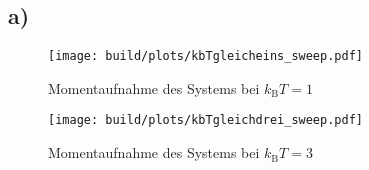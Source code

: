 \subsection*{a)}
\begin{figure*}
        \centering
        \begin{subfigure}[b]{0.475\textwidth}
            \centering
            \texttt{[image: build/plots/kbTgleicheins\_sweep.pdf]}
            \caption[Network2]%
            {{\small Momentaufnahme des Systems bei $k_\text{B}T=1$}}
            \label{fig:lcghist1}
        \end{subfigure}
        \hfill
        \begin{subfigure}[b]{0.475\textwidth}
            \centering
            \texttt{[image: build/plots/kbTgleichdrei\_sweep.pdf]}
            \caption[]%
            {{\small Momentaufnahme des Systems bei $k_\text{B}T=3$}}
            \label{fig:lcghist2}
        \end{subfigure}
    \end{figure*}

